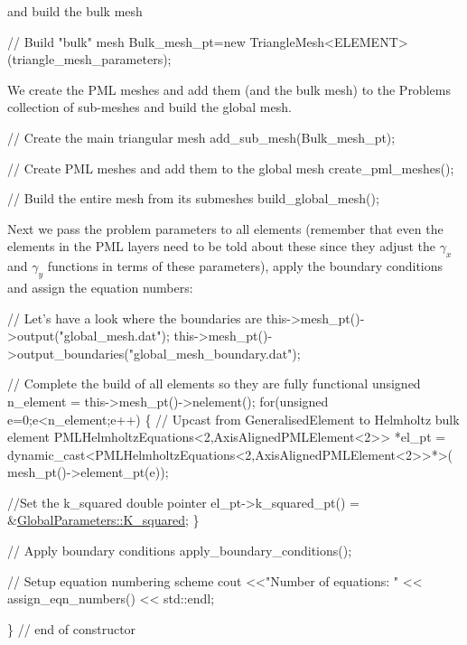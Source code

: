and build the bulk mesh


\begin{DoxyCodeInclude}
 \textcolor{comment}{// Build "bulk" mesh}
 Bulk\_mesh\_pt=\textcolor{keyword}{new} TriangleMesh<ELEMENT>(triangle\_mesh\_parameters);

\end{DoxyCodeInclude}


We create the P\+ML meshes and add them (and the bulk mesh) to the Problem\textquotesingle{}s collection of sub-\/meshes and build the global mesh.


\begin{DoxyCodeInclude}
 \textcolor{comment}{// Create the main triangular mesh}
 add\_sub\_mesh(Bulk\_mesh\_pt);

 \textcolor{comment}{// Create PML meshes and add them to the global mesh}
 create\_pml\_meshes();

 \textcolor{comment}{// Build the entire mesh from its submeshes}
 build\_global\_mesh();

\end{DoxyCodeInclude}


Next we pass the problem parameters to all elements (remember that even the elements in the P\+ML layers need to be told about these since they adjust the $ \gamma_x $ and $ \gamma_y $ functions in terms of these parameters), apply the boundary conditions and assign the equation numbers\+:


\begin{DoxyCodeInclude}

 \textcolor{comment}{// Let's have a look where the boundaries are}
 this->mesh\_pt()->output(\textcolor{stringliteral}{"global\_mesh.dat"});
 this->mesh\_pt()->output\_boundaries(\textcolor{stringliteral}{"global\_mesh\_boundary.dat"});

 \textcolor{comment}{// Complete the build of all elements so they are fully functional}
 \textcolor{keywordtype}{unsigned} n\_element = this->mesh\_pt()->nelement();
 \textcolor{keywordflow}{for}(\textcolor{keywordtype}{unsigned} e=0;e<n\_element;e++)
  \{
   \textcolor{comment}{// Upcast from GeneralisedElement to Helmholtz bulk element}
   PMLHelmholtzEquations<2,AxisAlignedPMLElement<2>> *el\_pt =
    \textcolor{keyword}{dynamic\_cast<}PMLHelmholtzEquations<2,AxisAlignedPMLElement<2>\textcolor{keyword}{>}*>(
      mesh\_pt()->element\_pt(e));

   \textcolor{comment}{//Set the k\_squared double pointer}
   el\_pt->k\_squared\_pt() = &\hyperlink{namespaceGlobalParameters_aae73cb63b27d51a87845c3392cd944eb}{GlobalParameters::K\_squared};
  \}

 \textcolor{comment}{// Apply boundary conditions}
 apply\_boundary\_conditions();

 \textcolor{comment}{// Setup equation numbering scheme}
 cout <<\textcolor{stringliteral}{"Number of equations: "} << assign\_eqn\_numbers() << std::endl;

\} \textcolor{comment}{// end of constructor}

\end{DoxyCodeInclude}


